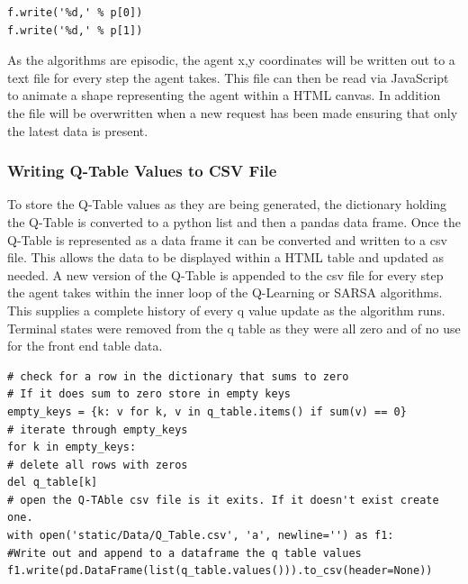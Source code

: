 \begin{verbatim}
f.write('%d,' % p[0])
f.write('%d,' % p[1])
\end{verbatim}
As the algorithms are episodic, the agent x,y coordinates will be written out to a text file for every step the agent takes. This file can then be read via JavaScript to animate a shape representing the agent within a HTML canvas.
In addition the file will be overwritten when a new request has been made ensuring that only the latest data is present.
\subsubsection{Writing Q-Table Values to CSV File}
To store the Q-Table values as they are being generated, the dictionary holding the Q-Table is converted to a python list and then a pandas data frame. Once the Q-Table is represented as a data frame it can be converted and written to a csv file. This allows the data to be displayed within a HTML table and updated as needed. A new version of the Q-Table is appended to the csv file for every step the agent takes within the inner loop of the Q-Learning or SARSA algorithms. This supplies a complete history of every q value update as the algorithm runs. Terminal states were removed from the q table as they were all zero and of no use for the front end table data.

\begin{verbatim}
# check for a row in the dictionary that sums to zero
# If it does sum to zero store in empty keys
empty_keys = {k: v for k, v in q_table.items() if sum(v) == 0}
# iterate through empty_keys
for k in empty_keys:
# delete all rows with zeros
del q_table[k]
# open the Q-TAble csv file is it exits. If it doesn't exist create one.
with open('static/Data/Q_Table.csv', 'a', newline='') as f1:
#Write out and append to a dataframe the q table values
f1.write(pd.DataFrame(list(q_table.values())).to_csv(header=None))
\end{verbatim}
